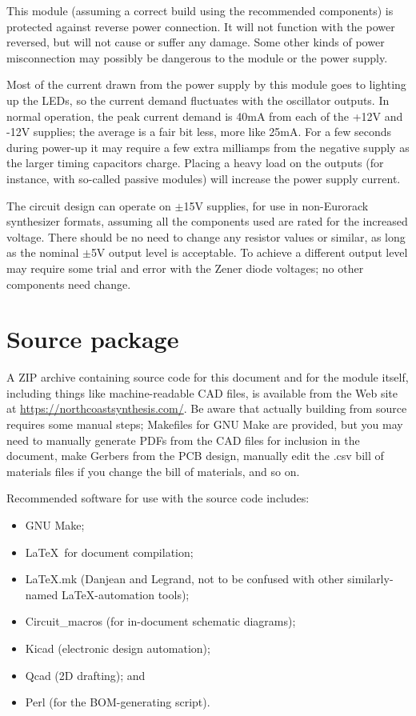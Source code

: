 This module (assuming a correct build using the recommended components) is
protected against reverse power connection.  It will not function with the
power reversed, but will not cause or suffer any damage.  Some other kinds
of power misconnection may possibly be dangerous to the module or the power
supply.

Most of the current drawn from the power supply by this module goes to
lighting up the LEDs, so the current demand fluctuates with the oscillator
outputs.  In normal operation, the peak current demand is 40mA from each of
the +12V and -12V supplies; the average is a fair bit less, more like 25mA. 
For a few seconds during power-up it may require a few extra milliamps from
the negative supply as the larger timing capacitors charge.  Placing a heavy
load on the outputs (for instance, with so-called passive modules) will
increase the power supply current.

The circuit design can operate on $\pm$15V supplies, for use in non-Eurorack
synthesizer formats, assuming all the components used are rated for the
increased voltage.  There should be no need to change any resistor values or
similar, as long as the nominal $\pm$5V output level is acceptable.  To
achieve a different output level may require some trial and error with the
Zener diode voltages; no other components need change.

\section{Source package}

A ZIP archive containing source code for this document and for the module
itself, including things like machine-readable CAD files, is available from 
the Web site at 
\url{https://northcoastsynthesis.com/}.  Be aware that actually building
from source requires some manual steps; Makefiles for GNU Make are provided,
but you may need to manually generate PDFs from the CAD files for inclusion
in the document, make Gerbers from the PCB design, manually edit the .csv
bill of materials files if you change the bill of materials, and so on.

Recommended software for use with the source code includes:
\begin{itemize}
  \item GNU Make;
  \item \LaTeX\ for document compilation;
  \item LaTeX.mk (Danjean and Legrand, not to be confused with other
    similarly-named \LaTeX-automation tools);
  \item Circuit\_macros (for in-document schematic diagrams);
  \item Kicad (electronic design automation);
  \item Qcad (2D drafting); and
  \item Perl (for the BOM-generating script).
\end{itemize}

